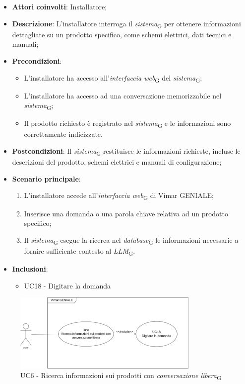 \begin{itemize}
    \item \textbf{Attori coinvolti}: Installatore;
    \item \textbf{Descrizione}: L’installatore interroga il \textit{sistema}\textsubscript{G} per ottenere informazioni dettagliate su un prodotto specifico, come schemi elettrici, dati tecnici e manuali;
    \item \textbf{Precondizioni}: 
        \begin{itemize}
            \item L’installatore ha accesso all’\textit{interfaccia web}\textsubscript{G} del \textit{sistema}\textsubscript{G};
            \item L’installatore ha accesso ad una conversazione memorizzabile nel \textit{sistema}\textsubscript{G};
            \item Il prodotto richiesto è registrato nel \textit{sistema}\textsubscript{G} e le informazioni sono correttamente indicizzate.
        \end{itemize}
    \item \textbf{Postcondizioni}: Il \textit{sistema}\textsubscript{G} restituisce le informazioni richieste, incluse le descrizioni del prodotto, schemi elettrici e manuali di configurazione;
    \item \textbf{Scenario principale}:
    \begin{enumerate}
    \item L’installatore accede all’\textit{interfaccia web}\textsubscript{G} di Vimar GENIALE;
    \item Inserisce una domanda o una parola chiave relativa ad un prodotto specifico;
    \item Il \textit{sistema}\textsubscript{G} esegue la ricerca nel \textit{database}\textsubscript{G} le informazioni necessarie a fornire sufficiente contesto al \textit{LLM}\textsubscript{G}.
    \end{enumerate}
    \item \textbf{Inclusioni}:
    \begin{itemize}
        \item UC18 - Digitare la domanda
    \end{itemize}

\end{itemize}
\begin{figure}[H]
\centering
\includegraphics[width=0.8\textwidth]{contents/casi_duso/png/UC6.png}
\caption{UC6 - Ricerca informazioni sui prodotti con \textit{conversazione libera}\textsubscript{G}}
\end{figure}


